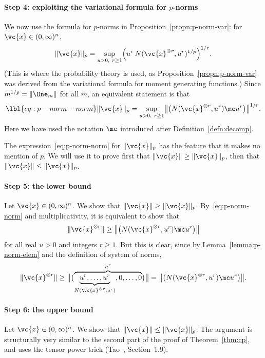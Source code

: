 \paragraph*{Step 4: exploiting the variational formula for $p$-norms}
We now use the formula for $p$-norms in Proposition~\ref{propn:p-norm-var}:
for $\vc{x} \in (0, \infty)^n$,
\[
\|\vc{x}\|_p 
=
\sup_{u > 0, \ r \geq 1} 
\Bigl(
u^r \, N(\vc{x}^{\otimes r}, u^r)^{1/p}
\Bigr)^{1/r}.
\]
(This is where the probability theory is used, as
Proposition~\ref{propn:p-norm-var} was derived from the variational
formula for moment generating functions.)  Since $m^{1/p} =
\|\One_m\|$ for all $m$, an equivalent statement is that
% 
\begin{equation}
\lbl{eq:p-norm-norm}
\|\vc{x}\|_p
=
\sup_{u > 0, \ r \geq 1}
\bigl\|
\bigl( 
N(\vc{x}^{\otimes r}, u^r) \mc u^r
\bigr)
\bigr\|^{1/r}.
\end{equation}
% 
Here we have used the notation $\mc$ introduced after
Definition~\ref{defn:decomp}.

The expression~\eqref{eq:p-norm-norm} for $\|\vc{x}\|_p$ has the feature
that it makes no mention of $p$.  We will use it to prove first that
$\|\vc{x}\| \geq \|\vc{x}\|_p$, then that $\|\vc{x}\| \leq \|\vc{x}\|_p$.

\paragraph{Step 5: the lower bound} 
Let $\vc{x} \in (0, \infty)^n$.  We show that $\|\vc{x}\| \geq
\|\vc{x}\|_p$.  By~\eqref{eq:p-norm-norm} and multiplicativity, it is
equivalent to show that
\[
\|\vc{x}^{\otimes r}\|
\geq
\bigl\|
\bigl( 
N(\vc{x}^{\otimes r}, u^r) \mc u^r
\bigr)
\bigr\|
\]
for all real $u > 0$ and integers $r \geq 1$.  But this is clear, since by
Lemma~\ref{lemma:p-norm-elem} and the definition of
system of norms, 
\[
\|\vc{x}^{\otimes r}\|
\geq 
\bigl\|\bigl(
\overbrace{
\underbrace{u^r, \ldots, u^r}_{N(\vc{x}^{\otimes r}, u^r)},
0, \ldots, 0}^{n^r}
\bigr)\bigr\|
=
\bigl\| \bigl(
N(\vc{x}^{\otimes r}, u^r) \mc u^r
\bigr) \bigr\|.
\]

\paragraph*{Step 6: the upper bound}
Let $\vc{x} \in (0, \infty)^n$.  We show that $\|\vc{x}\| \leq
\|\vc{x}\|_p$.  The argument is structurally very similar to the 
second part of the proof of Theorem~\ref{thm:cp}, and uses the tensor%
%
% 
power trick (Tao~\cite{TaoSR}, Section~1.9).


